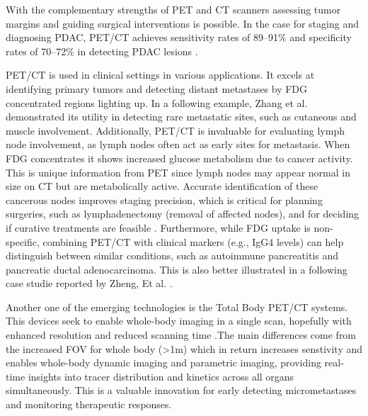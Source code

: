 \begin{multicols}{2}


With the complementary strengths of PET and CT scanners assessing tumor margins and guiding surgical interventions is possible. In the case for staging and diagnosing PDAC, PET/CT achieves sensitivity rates of 89–91\% and specificity rates of 70–72\% in detecting PDAC lesions \cite{TG174}.

PET/CT is used in clinical settings in various applications. It excels at identifying primary tumors and detecting distant metastases by FDG concentrated regions lighting up. In a following example, Zhang et al. demonstrated its utility in detecting rare metastatic sites, such as cutaneous and muscle involvement\cite{Zhang2023}. Additionally, PET/CT is invaluable for evaluating lymph node involvement, as lymph nodes often act as early sites for metastasis. When FDG concentrates it shows increased glucose metabolism due to cancer activity. This is unique information from PET since lymph nodes may appear normal in size on CT but are metabolically active. Accurate identification of these cancerous nodes improves staging precision, which is critical for planning surgeries, such as lymphadenectomy (removal of affected nodes), and for deciding if curative treatments are feasible \cite{TG174}.  Furthermore, while FDG uptake is non-specific, combining PET/CT with clinical markers (e.g., IgG4 levels) can help  distinguish between similar conditions, such as autoimmune pancreatitis and pancreatic ductal adenocarcinoma. This is also better illustrated in a following case studie reported by Zheng, Et al. \cite{Zheng2018}.

Another one of the emerging technologies is the Total Body PET/CT systems. This devices seek to enable whole-body imaging in a single scan, hopefully with enhanced resolution and reduced scanning time \cite{SunderlandSeminar}.The main differences come from the increased FOV for whole body (>1m) which in return increases senstivity and enables whole-body dynamic imaging and parametric imaging, providing real-time insights into tracer distribution and kinetics across all organs simultaneously. This is a valuable innovation for early detecting micrometastases and monitoring therapeutic responses.



\end{multicols}

